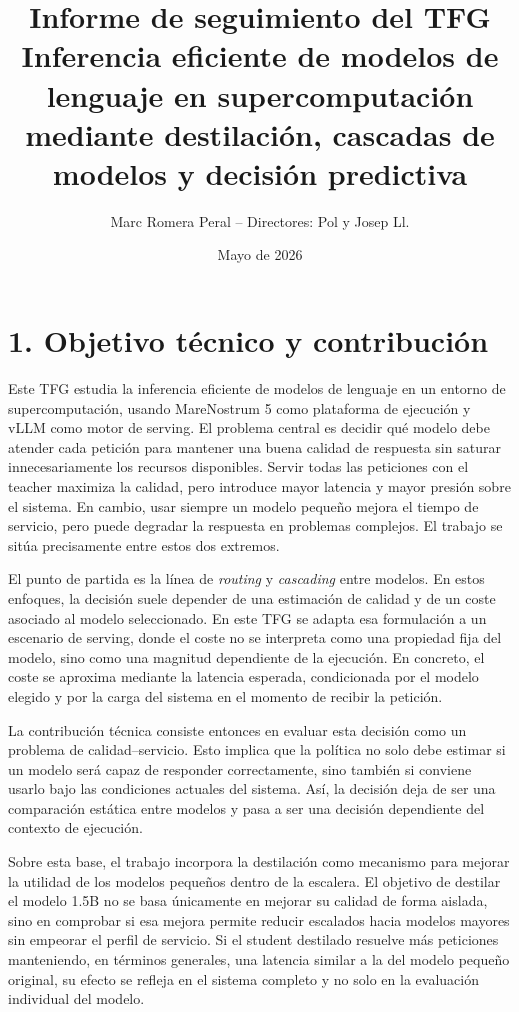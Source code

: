 \documentclass[9pt,a4paper]{article}
\title{\vspace{-1.4cm}\textbf{Informe de seguimiento del TFG}\\[-0.05cm]
\large Inferencia eficiente de modelos de lenguaje en supercomputación mediante destilación, cascadas de modelos y decisión predictiva}
\author{Marc Romera Peral \hspace{0.4em}--\hspace{0.4em} Directores: Pol y Josep Ll.}
\date{Mayo de 2026}
\begin{document}
\maketitle
\vspace{-0.65cm}

\section*{1. Objetivo técnico y contribución}

Este TFG estudia la inferencia eficiente de modelos de lenguaje en un entorno de supercomputación, usando MareNostrum 5 como plataforma de ejecución y vLLM como motor de serving. El problema central es decidir qué modelo debe atender cada petición para mantener una buena calidad de respuesta sin saturar innecesariamente los recursos disponibles. Servir todas las peticiones con el teacher maximiza la calidad, pero introduce mayor latencia y mayor presión sobre el sistema. En cambio, usar siempre un modelo pequeño mejora el tiempo de servicio, pero puede degradar la respuesta en problemas complejos. El trabajo se sitúa precisamente entre estos dos extremos.

El punto de partida es la línea de \textit{routing} y \textit{cascading} entre modelos. En estos enfoques, la decisión suele depender de una estimación de calidad y de un coste asociado al modelo seleccionado. En este TFG se adapta esa formulación a un escenario de serving, donde el coste no se interpreta como una propiedad fija del modelo, sino como una magnitud dependiente de la ejecución. En concreto, el coste se aproxima mediante la latencia esperada, condicionada por el modelo elegido y por la carga del sistema en el momento de recibir la petición.

La contribución técnica consiste entonces en evaluar esta decisión como un problema de calidad--servicio. Esto implica que la política no solo debe estimar si un modelo será capaz de responder correctamente, sino también si conviene usarlo bajo las condiciones actuales del sistema. Así, la decisión deja de ser una comparación estática entre modelos y pasa a ser una decisión dependiente del contexto de ejecución.

Sobre esta base, el trabajo incorpora la destilación como mecanismo para mejorar la utilidad de los modelos pequeños dentro de la escalera. El objetivo de destilar el modelo 1.5B no se basa únicamente en mejorar su calidad de forma aislada, sino en comprobar si esa mejora permite reducir escalados hacia modelos mayores sin empeorar el perfil de servicio. Si el student destilado resuelve más peticiones manteniendo, en términos generales, una latencia similar a la del modelo pequeño original, su efecto se refleja en el sistema completo y no solo en la evaluación individual del modelo.
\end{document}
